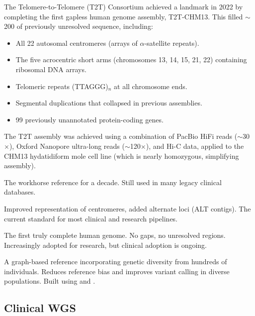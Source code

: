 The Telomere-to-Telomere (T2T) Consortium achieved a landmark in 2022 by completing the first gapless human genome assembly, T2T-CHM13. This filled $\sim$200\megabase{} of previously unresolved sequence, including:

\begin{itemize}[nosep]
  \item All 22 autosomal centromeres (arrays of $\alpha$-satellite repeats).
  \item The five acrocentric short arms (chromosomes 13, 14, 15, 21, 22) containing ribosomal DNA arrays.
  \item Telomeric repeats (TTAGGG)$_n$ at all chromosome ends.
  \item Segmental duplications that collapsed in previous assemblies.
  \item 99 previously unannotated protein-coding genes.
\end{itemize}

The T2T assembly was achieved using a combination of PacBio HiFi reads ($\sim$30$\times$), Oxford Nanopore ultra-long reads ($\sim$120$\times$), and Hi-C data, applied to the CHM13 hydatidiform mole cell line (which is nearly homozygous, simplifying assembly).

\begin{keyconcept}[title={The Evolution of Human Reference Genomes}]
\begin{description}[nosep,style=nextline]
  \item[GRCh37/hg19 (2009)] The workhorse reference for a decade. Still used in many legacy clinical databases.
  \item[GRCh38/hg38 (2013)] Improved representation of centromeres, added alternate loci (ALT contigs). The current standard for most clinical and research pipelines.
  \item[T2T-CHM13 (2022)] The first truly complete human genome. No gaps, no unresolved regions. Increasingly adopted for research, but clinical adoption is ongoing.
  \item[Human Pangenome Reference (2023--)] A graph-based reference incorporating genetic diversity from hundreds of individuals. Reduces reference bias and improves variant calling in diverse populations. Built using  and .
\end{description}
\end{keyconcept}

\subsection{Clinical WGS}

